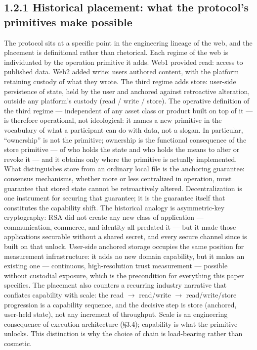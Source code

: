 \documentclass[
]{article}
\begin{document}
\subsection{1.2.1 Historical placement: what the protocol's primitives
make
possible}\label{historical-placement-what-the-protocols-primitives-make-possible}

The protocol sits at a specific point in the engineering lineage of the
web, and the placement is definitional rather than rhetorical. Each
regime of the web is individuated by the operation primitive it adds.
Web1 provided read: access to published data. Web2 added write: users
authored content, with the platform retaining custody of what they
wrote. The third regime adds store: user-side persistence of state, held
by the user and anchored against retroactive alteration, outside any
platform's custody (read / write / store). The operative definition of
the third regime --- independent of any asset class or product built on
top of it --- is therefore operational, not ideological: it names a new
primitive in the vocabulary of what a participant can do with data, not
a slogan. In particular, ``ownership'' is not the primitive; ownership
is the functional consequence of the store primitive --- of who holds
the state and who holds the means to alter or revoke it --- and it
obtains only where the primitive is actually implemented. What
distinguishes store from an ordinary local file is the anchoring
guarantee: consensus mechanisms, whether more or less centralized in
operation, must guarantee that stored state cannot be retroactively
altered. Decentralization is one instrument for securing that guarantee;
it is the guarantee itself that constitutes the capability shift. The
historical analogy is asymmetric-key cryptography: RSA did not create
any new class of application --- communication, commerce, and identity
all predated it --- but it made those applications securable without a
shared secret, and every secure channel since is built on that unlock.
User-side anchored storage occupies the same position for measurement
infrastructure: it adds no new domain capability, but it makes an
existing one --- continuous, high-resolution trust measurement ---
possible without custodial exposure, which is the precondition for
everything this paper specifies. The placement also counters a recurring
industry narrative that conflates capability with scale: the read
\(\to\) read/write \(\to\) read/write/store progression is a capability
sequence, and the decisive step is store (anchored, user-held state),
not any increment of throughput. Scale is an engineering consequence of
execution architecture (§3.4); capability is what the primitive unlocks.
This distinction is why the choice of chain is load-bearing rather than
cosmetic.
\end{document}
